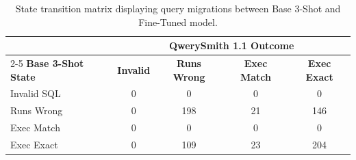\begin{table}[t]
\centering\small
\begin{tabular}{lcccc}
\toprule
 & \multicolumn{4}{c}{\textbf{QwerySmith 1.1 Outcome}} \\
\cmidrule(lr){2-5}
\textbf{Base 3-Shot State} & \textbf{Invalid} & \textbf{Runs Wrong} & \textbf{Exec Match} & \textbf{Exec Exact} \\
\midrule
Invalid SQL & 0 & 0 & 0 & 0 \\
Runs Wrong & 0 & 198 & 21 & 146 \\
Exec Match & 0 & 0 & 0 & 0 \\
Exec Exact & 0 & 109 & 23 & 204 \\
\bottomrule
\end{tabular}
\caption{State transition matrix displaying query migrations between Base 3-Shot and Fine-Tuned model.}
\label{tab:outcome_transition}
\end{table}
